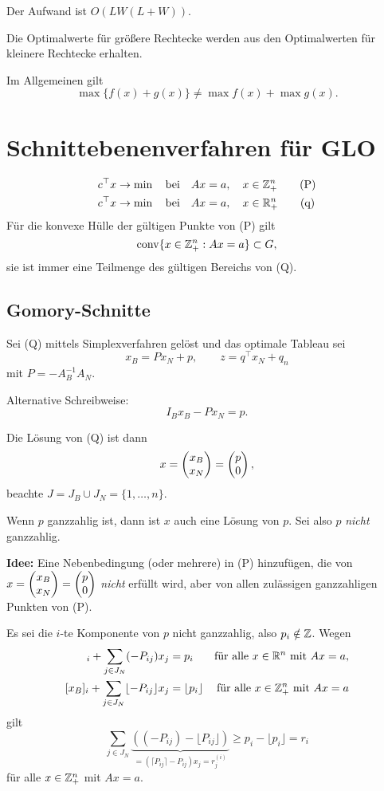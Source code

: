Der Aufwand ist $O(LW(L+W))$.

Die Optimalwerte für größere Rechtecke werden aus den Optimalwerten für kleinere
Rechtecke erhalten.

Im Allgemeinen gilt
\[ \max \{ f(x) + g(x) \} \ne \max f(x) + \max g(x). \]

\section{Schnittebenenverfahren für GLO}
\begin{align*}
  c^\top x \to \min \quad \text{bei} \quad Ax &= a, \quad x \in \mathbb{Z}_+^n \tag{P} \\
  c^\top x \to \min \quad \text{bei} \quad Ax &= a, \quad x \in \mathbb{R}_+^n \tag{q}
\end{align*}
Für die konvexe Hülle der gültigen Punkte von (P) gilt
\[ \operatorname{conv} \{ x \in \mathbb{Z}_+^n : Ax = a \} \subset G, \]
sie ist immer eine Teilmenge des gültigen Bereichs von (Q).

\subsection{Gomory-Schnitte}
Sei (Q) mittels Simplexverfahren gelöst und das optimale Tableau sei
\[ x_B = P x_N + p, \qquad z = q^\top x_N + q_n \]
mit $P = -A_B^{-1} A_N$.

Alternative Schreibweise:
\[ I_B x_B - P x_N = p. \]

Die Lösung von (Q) ist dann
\[ x = \begin{pmatrix}x_B \\ x_N\end{pmatrix} = \begin{pmatrix}p \\ 0\end{pmatrix}, \]
beachte $J = J_B \cup J_N = \{ 1, \ldots, n \}$.

Wenn $p$ ganzzahlig ist, dann ist $x$ auch eine Lösung von $p$. Sei also $p$
\emph{nicht} ganzzahlig.

\textbf{Idee:} Eine Nebenbedingung (oder mehrere) in (P) hinzufügen, die von
$x = \begin{pmatrix}x_B \\ x_N\end{pmatrix} = \begin{pmatrix}p \\ 0\end{pmatrix}$ \emph{nicht} erfüllt wird, aber von
allen zulässigen ganzzahligen Punkten von (P).

Es sei die $i$-te Komponente von $p$ nicht ganzzahlig, also $p_i \notin
\mathbb{Z}$. Wegen
\begin{align*}
  [x_B]_i + \sum_{j \in J_N} (-P_{ij}) x_j &= p_i
  & \text{für alle }  x \in \real^n \text{ mit } Ax = a, \\
  [x_B]_i + \sum_{j \in J_N} \lfloor -P_{ij} \rfloor x_j &= \lfloor p_i \rfloor
  & \text{für alle }  x \in \integer_+^n \text{ mit } Ax = a 
\end{align*}
gilt
\[ \sum_{j \in J_N}
  \underbrace{((-P_{ij}) - \lfloor P_{ij} \rfloor)}_{=(\lceil P_{ij} \rceil -
    P_{ij}) x_j = r_{j}^{(i)}}
  \ge p_i - \lfloor p_i \rfloor = r_i \]
für alle $x \in \mathbb{Z}_+^n$ mit $Ax = a$.

